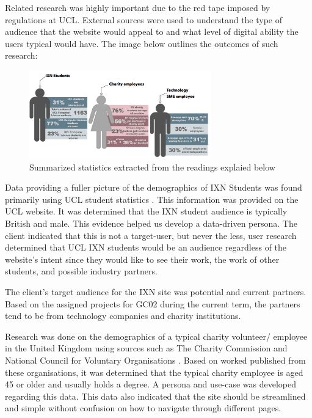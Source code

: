 \documentclass[fontsize=10pt]{extarticle}
\numberwithin{figure}{section} %
\begin{document}
Related research was highly important due to the red tape imposed by
regulations at UCL. External sources were used to understand the type of
audience that the website would appeal to and what level of digital
ability the users typical would have. The image below outlines the
outcomes of such research:

\begin{figure}[H]
      \centering
      \includegraphics[trim = 0 0 0 0, clip, width=0.7\textwidth]{p21.png}
      \caption{Summarized statistics extracted from the readings explaied below}
 \end{figure}

Data providing a fuller picture of the demographics of IXN Students was
found primarily using UCL student statistics \cite{ps1}. This
information was provided on the UCL website. It was determined that the
IXN student audience is typically British and male. This evidence helped
us develop a data-driven persona. The client indicated that this is not
a target-user, but never the less, user research determined that UCL IXN
students would be an audience regardless of the website's intent since
they would like to see their work, the work of other students, and
possible industry partners.

The client's target audience for the IXN site was potential and current
partners. Based on the assigned projects for GC02 during the current
term, the partners tend to be from technology companies and charity
institutions.

Research was done on the demographics of a typical charity volunteer/
employee in the United Kingdom using sources such as The Charity
Commission \cite{ps2} and National Council for Voluntary Organisations
\cite{ps3}. Based on worked published from these organisations, it was
determined that the typical charity employee is aged 45 or older and
usually holds a degree. A persona and use-case was developed regarding
this data. This data also indicated that the site should be streamlined
and simple without confusion on how to navigate through different pages.
\end{document}
